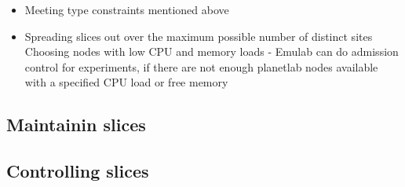 \begin{itemize}
\item Meeting type constraints mentioned above
\item Spreading slices out over the maximum possible number of distinct sites
\itme Choosing nodes with low CPU and memory loads - Emulab can do admission
    control for experiments, if there are not enough planetlab nodes available
    with a specified CPU load or free memory
\end{itemize}

\subsection{Maintainin slices}

\subsection{Controlling slices}
